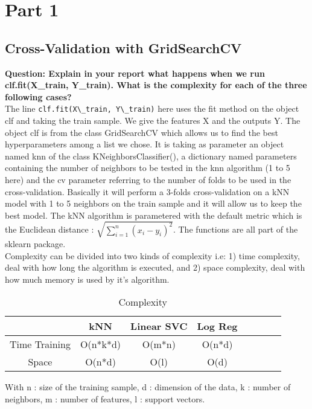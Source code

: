\section{Part 1}

\subsection{Cross-Validation with GridSearchCV}
\textbf{{Question}: Explain in your report what happens when we run clf.fit(X\_train, Y\_train). What is the complexity for each of the three following cases?} \\

The line \verb|clf.fit(X\_train, Y\_train)| here uses the fit method on the object  clf and taking the train sample. We give the features X and the outputs Y. The object clf is from the class GridSearchCV which allows us to find the best hyperparameters among a list we chose. It is taking as parameter an object named knn of the class KNeighborsClassifier(), a dictionary named parameters containing the number of neighbors to be tested in the knn algorithm (1 to 5 here) and the cv parameter referring to the number of folds to be used in the cross-validation. Basically it will perform a 3-folds cross-validation on a kNN model with 1 to 5 neighbors on the train sample and it will allow us to keep the best model. The kNN algorithm is parametered with the default metric which is the Euclidean distance : $\sqrt{\sum^n_{i=1}(x_i - y_i)^2}$. The functions are all part of the sklearn package. \\

Complexity can be divided into two kinds of complexity i.e: 1) time complexity, deal with how long the algorithm is executed, and 2) space complexity, deal with how much memory is used by it's algorithm.
\begin{table}[ht]
		\caption{Complexity}
		\vspace{0.5cm}
		\centering
		\begin{tabular}{|c|c|c|c|c|c|c|c|}
			\hline
			& kNN & Linear SVC & Log Reg   \\  [0.3ex]
			\hline 
			Time Training    & O(n*k*d)       &  O(m*n)     & O(n*d)        \\ 
			\hline 
			Space  &  O(n*d)      &  O(l)     &  O(d)      \\ 
			\hline 
		\end{tabular} 
        \label{table:nonlin}
	\end{table}	

With n : size of the training sample, d : dimension of the data, k : number of neighbors, m : number of features, l : support vectors. \\

